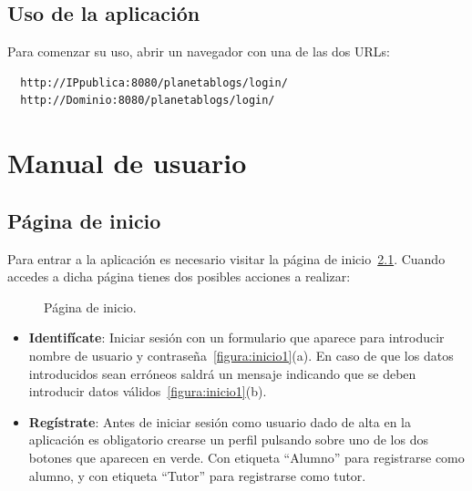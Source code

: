 \documentclass[a4paper, 12pt]{book}
\begin{document}
\section{Uso de la aplicaci\'on}
Para comenzar su uso, abrir un navegador con una de las dos URLs: 
  {\footnotesize\begin{verbatim} 
  http://IPpublica:8080/planetablogs/login/
  http://Dominio:8080/planetablogs/login/\end{verbatim}}

\chapter{Manual de usuario}
\label{app:manual}


\section{P\'agina de inicio}
Para entrar a la aplicaci\'on es necesario visitar la p\'agina de inicio~\ref{figura:inicio}. Cuando accedes a dicha p\'agina tienes dos posibles 
acciones a realizar:

\begin{figure}[htbp] 
  \centering
  \caption{P\'agina de inicio.}
  \label{figura:inicio}
\end{figure}

\begin{itemize}
  \item {\bfseries Identif\'icate}: Iniciar sesi\'on con un formulario que aparece para introducir nombre de usuario y contrase\~na~\ref{figura:inicio1}(a).
  En caso de que los datos introducidos sean err\'oneos saldr\'a un mensaje indicando que se deben introducir datos v\'alidos~\ref{figura:inicio1}(b).
  \item {\bfseries Reg\'istrate}: Antes de iniciar sesi\'on como usuario dado de alta en la aplicaci\'on es obligatorio crearse un perfil pulsando sobre 
  uno de los dos botones que aparecen en verde. Con etiqueta ``Alumno'' para registrarse como alumno, y con etiqueta ``Tutor'' para registrarse como tutor.
\end{itemize} 
\end{document}
